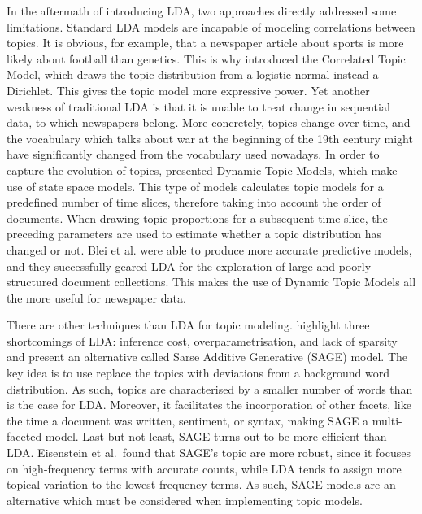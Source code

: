 In the aftermath of introducing LDA, two approaches directly addressed some limitations. Standard LDA models are incapable of modeling correlations between topics. It is obvious, for example, that a newspaper article about sports is more likely about football than genetics. This is why \citet{Blei:2005:CTM:2976248.2976267} introduced the Correlated Topic Model, which draws the topic distribution from a logistic normal instead a Dirichlet. This gives the topic model more expressive power. Yet another weakness of traditional LDA is that it is unable to treat change in sequential data, to which newspapers belong. More concretely, topics change over time, and the vocabulary which talks about war at the beginning of the 19th century might have significantly changed from the vocabulary used nowadays. In order to capture the evolution of topics, \citet{bleidynamic2006} presented Dynamic Topic Models, which make use of state space models. This type of models calculates topic models for a predefined number of time slices, therefore taking into account the order of documents. When drawing topic proportions for a subsequent time slice, the preceding parameters are used to estimate whether a topic distribution has changed or not. Blei et al. were able to produce more accurate predictive models, and they successfully geared LDA for the exploration of large and poorly structured document collections. This makes the use of Dynamic Topic Models all the more useful for newspaper data. 

There are other techniques than LDA for topic modeling. \citet{EisensteinAX11} highlight three shortcomings of LDA: inference cost, overparametrisation, and lack of sparsity and present an alternative called Sarse Additive Generative (SAGE) model. The key idea is to use  replace the topics with deviations from a background word distribution. As such, topics are characterised by a smaller number of words than is the case for LDA. Moreover, it facilitates the incorporation of other facets, like the time a document was written, sentiment, or syntax, making SAGE a multi-faceted model. Last but not least, SAGE turns out to be more efficient than LDA. Eisenstein et al.~found that SAGE's topic are more robust, since it focuses on high-frequency terms with accurate counts, while LDA tends to assign more topical variation to the lowest frequency terms. As such, SAGE models are an alternative which must be considered when implementing topic models.

